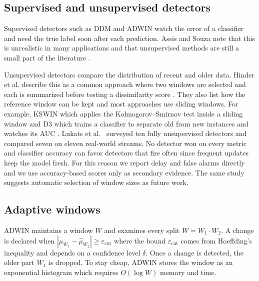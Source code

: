 \documentclass[conference]{IEEEtran}
\begin{document}
\subsection{Supervised and unsupervised detectors}

Supervised detectors such as DDM \cite{gama2004} and ADWIN \cite{bifet2007} watch the error of a classifier and need the true label soon after each prediction. Assis and Souza note that this is unrealistic in many applications and that unsupervised methods are still a small part of the literature \cite{assis2025}.

Unsupervised detectors compare the distribution of recent and older data. Hinder et al. describe this as a common approach where two windows are selected and each is summarized before testing a dissimilarity score \cite{hinder2024a}. They also list how the reference window can be kept and most approaches use sliding windows. For example, KSWIN which applies the Kolmogorov--Smirnov test inside a sliding window \cite{raab2020} and D3 which trains a classifier to separate old from new instances and watches its AUC \cite{gozuacik2019}. Lukats et al.\ \cite{lukats2025} surveyed ten fully unsupervised detectors and compared seven on eleven real-world streams. No detector won on every metric and classifier accuracy can favor detectors that fire often since frequent updates keep the model fresh. For this reason we report delay and false alarms directly and we use accuracy-based scores only as secondary evidence. The same study suggests automatic selection of window sizes as future work.

\subsection{Adaptive windows}

ADWIN \cite{bifet2007} maintains a window $W$ and examines every split $W=W_1\cdot W_2$. A change is declared when $|\hat\mu_{W_1}-\hat\mu_{W_2}|\ge\varepsilon_{\mathrm{cut}}$ where the bound $\varepsilon_{\mathrm{cut}}$ comes from Hoeffding's inequality \cite{hoeffding1963} and depends on a confidence level $\delta$. Once a change is detected, the older part $W_1$ is dropped. To stay cheap, ADWIN stores the window as an exponential histogram \cite{datar2002} which requires $O(\log W)$ memory and time.
\end{document}
